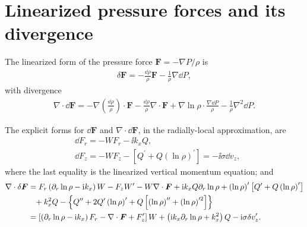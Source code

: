 
\section{Linearized pressure forces and its divergence}\label{lin_press}
The linearized form of the pressure force $\bm{F} = -\nabla P/\rho$ is  
\begin{align}
  \delta \bm{F} = - \frac{\dd\rho}{\rho}\bm{F} -
  \frac{1}{\rho}\nabla\dd P,
\end{align}
with divergence
\begin{align}
  \nabla\cdot\dd\bm{F} = -
  \nabla\left(\frac{\dd\rho}{\rho}\right)\cdot\bm{F} -
  \frac{\dd\rho}{\rho}\nabla\cdot\bm{F} +
  \nabla\ln{\rho}\cdot\frac{\nabla\dd P}{\rho} -
  \frac{1}{\rho}\nabla^2\dd P. 
\end{align}


The explicit forms for $\dd\bm{F}$ and $\nabla\cdot\dd\bm{F}$, in the
radially-local approximation, are
\begin{align}
  &\dd F_r = - W F_r - \ii k_x Q,\\
  &\dd F_z = - W F_z - \left[Q^\prime + Q
    \left(\ln{\rho}\right)^\prime\right]  = - \ii\sigma \dd v_z, 
\end{align} 
where the last equality is the linearized
vertical momentum equation; and 
\begin{align}
  \nabla\cdot\delta\bm{F} &= F_r\left(\partial_r\ln{\rho} - \mathrm{i} k_x \right)W - F_z
  W^\prime - W \nabla\cdot\bm{F} + \mathrm{i} k_x Q \partial_r\ln{\rho} +
  \left(\ln{\rho}\right)^\prime\left[Q^\prime + Q
    \left(\ln{\rho}\right)^\prime\right] \notag\\
  & \phantom{=} + k_x^2 Q - \left\{Q^{\prime\prime} + 2
    Q^\prime\left(\ln{\rho}\right)^\prime
    + Q\left[\left(\ln{\rho}\right)^{\prime\prime}+\left(\ln{\rho}\right)^{\prime
      2}\right]\right\}\notag\\
    &= \left[\left(\partial_r\ln{\rho}-\mathrm{i} k_x\right)F_r - \nabla\cdot\bm{F} +
      F_z^\prime\right]W + \left(\mathrm{i} k_x \partial_r\ln{\rho} + k_x^2\right)Q  -
      \mathrm{i}\sigma \delta v_z^\prime.
\end{align}




